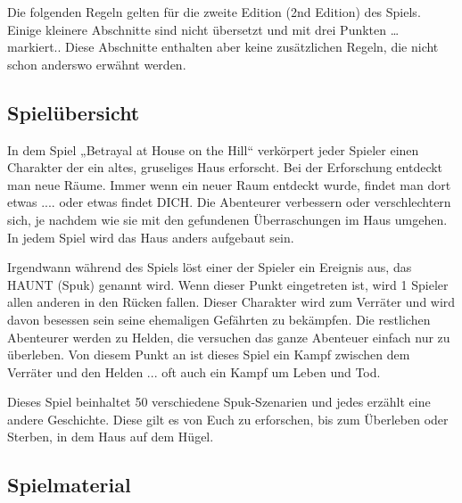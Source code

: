 
Die folgenden Regeln gelten für die zweite Edition (2nd Edition) des Spiels. Einige kleinere Abschnitte sind nicht übersetzt und mit drei Punkten … markiert.. Diese Abschnitte enthalten aber keine zusätzlichen Regeln, die nicht schon anderswo erwähnt werden.

\subsection{Spielübersicht}

In dem Spiel „Betrayal at House on the Hill“ verkörpert jeder Spieler einen Charakter der ein altes, gruseliges Haus erforscht. Bei der Erforschung entdeckt man neue Räume. Immer wenn ein neuer Raum entdeckt wurde, findet man dort etwas .... oder etwas findet DICH. Die Abenteurer verbessern oder verschlechtern sich, je nachdem wie sie mit den gefundenen Überraschungen im Haus umgehen. In jedem Spiel wird das Haus anders aufgebaut sein.

Irgendwann während des Spiels löst einer der Spieler ein Ereignis aus, das HAUNT (Spuk) genannt wird. Wenn dieser Punkt eingetreten ist, wird 1 Spieler allen anderen in den Rücken fallen. Dieser Charakter wird zum Verräter und wird davon besessen sein seine ehemaligen Gefährten zu bekämpfen. Die restlichen Abenteurer werden zu Helden, die versuchen das ganze Abenteuer einfach nur zu überleben. Von diesem Punkt an ist dieses Spiel ein Kampf zwischen dem Verräter und den Helden ... oft auch ein Kampf um Leben und Tod.

Dieses Spiel beinhaltet 50 verschiedene Spuk-Szenarien und jedes erzählt eine andere Geschichte. Diese gilt es von Euch zu erforschen, bis zum Überleben oder Sterben, in dem Haus auf dem Hügel.

\subsection{Spielmaterial}

